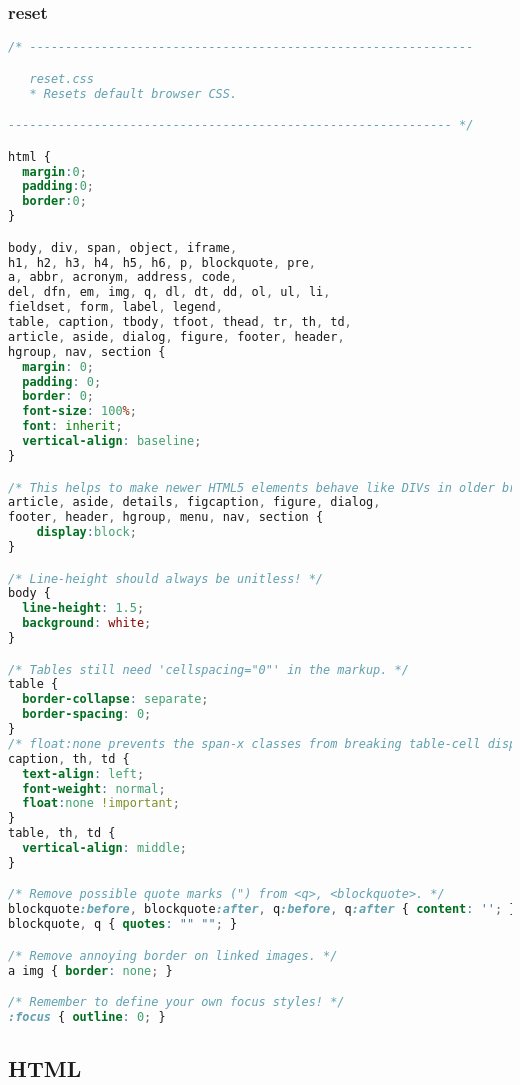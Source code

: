 \subsubsection{reset}
\begin{lstlisting}[language=CSS] 
/* --------------------------------------------------------------

   reset.css
   * Resets default browser CSS.

-------------------------------------------------------------- */

html {
  margin:0;
  padding:0;
  border:0;
}

body, div, span, object, iframe,
h1, h2, h3, h4, h5, h6, p, blockquote, pre,
a, abbr, acronym, address, code,
del, dfn, em, img, q, dl, dt, dd, ol, ul, li,
fieldset, form, label, legend,
table, caption, tbody, tfoot, thead, tr, th, td,
article, aside, dialog, figure, footer, header,
hgroup, nav, section {
  margin: 0;
  padding: 0;
  border: 0;
  font-size: 100%;
  font: inherit;
  vertical-align: baseline;
}

/* This helps to make newer HTML5 elements behave like DIVs in older browers */
article, aside, details, figcaption, figure, dialog,
footer, header, hgroup, menu, nav, section {
    display:block;
}

/* Line-height should always be unitless! */
body {
  line-height: 1.5;
  background: white;
}

/* Tables still need 'cellspacing="0"' in the markup. */
table {
  border-collapse: separate;
  border-spacing: 0;
}
/* float:none prevents the span-x classes from breaking table-cell display */
caption, th, td {
  text-align: left;
  font-weight: normal;
  float:none !important;
}
table, th, td {
  vertical-align: middle;
}

/* Remove possible quote marks (") from <q>, <blockquote>. */
blockquote:before, blockquote:after, q:before, q:after { content: ''; }
blockquote, q { quotes: "" ""; }

/* Remove annoying border on linked images. */
a img { border: none; }

/* Remember to define your own focus styles! */
:focus { outline: 0; }
\end{lstlisting}

\subsection{HTML}

